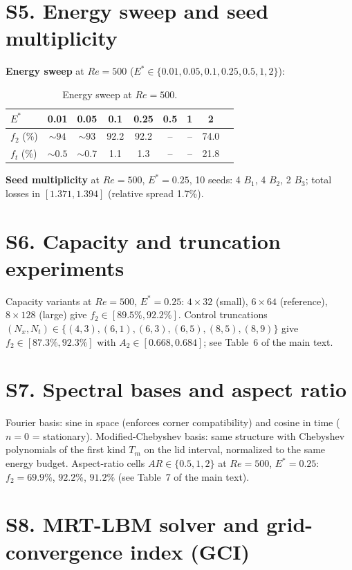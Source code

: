 \documentclass[11pt]{article}
\begin{document}
\section{S5. Energy sweep and seed multiplicity}
\label{sec:S5}

\textbf{Energy sweep} at $Re=500$ ($E^*\in\{0.01,0.05,0.1,0.25,0.5,1,2\}$):

\begin{table}[h]
\centering\small
\caption{Energy sweep at $Re=500$.}
\label{tab:S5a}
\begin{tabular}{lcccccccc}
\toprule
$E^*$ & 0.01 & 0.05 & 0.1 & 0.25 & 0.5 & 1 & 2\\
\midrule
$f_2$ (\%) & $\sim94$ & $\sim93$ & 92.2 & 92.2 & -- & -- & 74.0\\
$f_t$ (\%) & $\sim0.5$ & $\sim0.7$ & 1.1 & 1.3 & -- & -- & 21.8\\
\bottomrule
\end{tabular}
\end{table}

\textbf{Seed multiplicity} at $Re=500$, $E^*=0.25$, 10 seeds: 4 $B_1$,
4 $B_2$, 2 $B_3$; total losses in $[1.371,1.394]$ (relative spread 1.7\%).

\section{S6. Capacity and truncation experiments}
\label{sec:S6}

Capacity variants at $Re=500$, $E^*=0.25$: $4\times32$ (small),
$6\times64$ (reference), $8\times128$ (large) give
$f_2\in[89.5\%,92.2\%]$. Control truncations
$(N_x,N_t)\in\{(4,3),(6,1),(6,3),(6,5),(8,5),(8,9)\}$ give
$f_2\in[87.3\%,92.3\%]$ with $A_2\in[0.668,0.684]$; see Table~6 of the main
text.

\section{S7. Spectral bases and aspect ratio}
\label{sec:S7}

Fourier basis: sine in space (enforces corner compatibility) and cosine in
time ($n=0$ = stationary). Modified-Chebyshev basis: same structure with
Chebyshev polynomials of the first kind $T_m$ on the lid interval, normalized
to the same energy budget. Aspect-ratio cells $AR\in\{0.5,1,2\}$ at
$Re=500$, $E^*=0.25$: $f_2=69.9\%$, $92.2\%$, $91.2\%$ (see Table~7 of the
main text).

\section{S8. MRT-LBM solver and grid-convergence index (GCI)}
\label{sec:S8}
\end{document}
